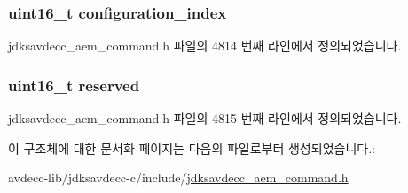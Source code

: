 \subsubsection[{\texorpdfstring{configuration\+\_\+index}{configuration_index}}]{\setlength{\rightskip}{0pt plus 5cm}uint16\+\_\+t configuration\+\_\+index}\hypertarget{structjdksavdecc__aem__command__read__descriptor__response_afaad1bd7c66f9611e134d8c5ce98f444}{}\label{structjdksavdecc__aem__command__read__descriptor__response_afaad1bd7c66f9611e134d8c5ce98f444}


jdksavdecc\+\_\+aem\+\_\+command.\+h 파일의 4814 번째 라인에서 정의되었습니다.

\subsubsection[{\texorpdfstring{reserved}{reserved}}]{\setlength{\rightskip}{0pt plus 5cm}uint16\+\_\+t reserved}\hypertarget{structjdksavdecc__aem__command__read__descriptor__response_a5a6ed8c04a3db86066924b1a1bf4dad3}{}\label{structjdksavdecc__aem__command__read__descriptor__response_a5a6ed8c04a3db86066924b1a1bf4dad3}


jdksavdecc\+\_\+aem\+\_\+command.\+h 파일의 4815 번째 라인에서 정의되었습니다.



이 구조체에 대한 문서화 페이지는 다음의 파일로부터 생성되었습니다.\+:\begin{DoxyCompactItemize}
\item 
avdecc-\/lib/jdksavdecc-\/c/include/\hyperlink{jdksavdecc__aem__command_8h}{jdksavdecc\+\_\+aem\+\_\+command.\+h}\end{DoxyCompactItemize}
